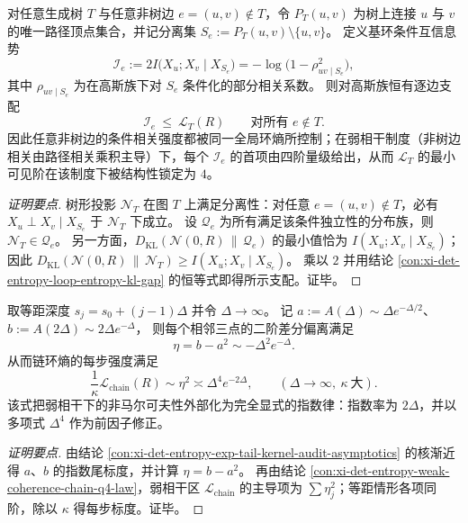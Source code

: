 \begin{conclusion}\label{con:xi-det-entropy-tree-basecycle-cmi-certificate}
对任意生成树 \(T\) 与任意非树边 \(e=(u,v)\notin T\)，令 \(P_T(u,v)\) 为树上连接 \(u\) 与 \(v\) 的唯一路径顶点集合，并记分离集
\(
S_e:=P_T(u,v)\setminus\{u,v\}
\)。
定义基环条件互信息势
\[
\mathcal I_e:=2I\!\bigl(X_u;X_v\mid X_{S_e}\bigr)
=-\log\bigl(1-\rho_{uv\mid S_e}^2\bigr),
\]
其中 \(\rho_{uv\mid S_e}\) 为在高斯族下对 \(S_e\) 条件化的部分相关系数。
则对高斯族恒有逐边支配
\[
\mathcal I_e\ \le\ \mathcal L_T(R)\qquad\text{对所有 }e\notin T.
\]
因此任意非树边的条件相关强度都被同一全局环熵所控制；在弱相干制度（非树边相关由路径相关乘积主导）下，每个 \(\mathcal I_e\) 的首项由四阶量级给出，从而 \(\mathcal L_T\) 的最小可见阶在该制度下被结构性锁定为 \(4\)。
\end{conclusion}
\begin{proof}[证明要点]
树形投影 \(\mathcal N_T\) 在图 \(T\) 上满足分离性：对任意 \(e=(u,v)\notin T\)，必有 \(X_u\perp X_v\mid X_{S_e}\) 于 \(\mathcal N_T\) 下成立。
设 \(\mathcal Q_e\) 为所有满足该条件独立性的分布族，则
\(
\mathcal N_T\in\mathcal Q_e
\)。
另一方面，\(D_{\mathrm{KL}}(\mathcal N(0,R)\,\|\,\mathcal Q_e)\) 的最小值恰为 \(I(X_u;X_v\mid X_{S_e})\)；
因此
\(
D_{\mathrm{KL}}(\mathcal N(0,R)\,\|\,\mathcal N_T)\ge I(X_u;X_v\mid X_{S_e})
\)。
乘以 \(2\) 并用结论 \ref{con:xi-det-entropy-loop-entropy-kl-gap} 的恒等式即得所示支配。证毕。
\end{proof}

\begin{conclusion}\label{con:xi-det-entropy-equispaced-loop-entropy-scaling}
取等距深度 \(s_j=s_0+(j-1)\Delta\) 并令 \(\Delta\to\infty\)。
记
\(
a:=A(\Delta)\sim \Delta e^{-\Delta/2}
\)、
\(
b:=A(2\Delta)\sim 2\Delta e^{-\Delta}
\)，
则每个相邻三点的二阶差分偏离满足
\[
\eta=b-a^2\sim-\Delta^2e^{-\Delta}.
\]
从而链环熵的每步强度满足
\[
\frac{1}{\kappa}\mathcal L_{\mathrm{chain}}(R)
\sim \eta^2
\asymp \Delta^{4}e^{-2\Delta},
\qquad (\Delta\to\infty,\ \kappa\ \text{大}).
\]
该式把弱相干下的非马尔可夫性外部化为完全显式的指数律：指数率为 \(2\Delta\)，并以多项式 \(\Delta^4\) 作为前因子修正。
\end{conclusion}
\begin{proof}[证明要点]
由结论 \ref{con:xi-det-entropy-exp-tail-kernel-audit-asymptotics} 的核渐近得 \(a\)、\(b\) 的指数尾标度，并计算 \(\eta=b-a^2\)。
再由结论 \ref{con:xi-det-entropy-weak-coherence-chain-q4-law}，弱相干区 \(\mathcal L_{\mathrm{chain}}\) 的主导项为 \(\sum \eta_j^2\)；等距情形各项同阶，除以 \(\kappa\) 得每步标度。证毕。
\end{proof}

